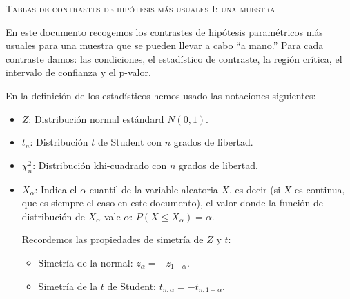 \documentclass{article}
\renewcommand{\leq}{\leqslant}
\begin{document}

\renewcommand{\thecas}{\Roman{cas}}
\newcommand{\posacas}{\addtocounter{cas}{1}{\bf \thecas}}

\begin{center}
\textsc{Tablas de contrastes de hipótesis más usuales I: una muestra}
\end{center}
\vspace*{2cm}

\noindent En este documento recogemos los contrastes de hipótesis paramétricos más usuales para una muestra  que se pueden llevar a cabo ``a mano.'' Para cada contraste damos: las condiciones, el estadístico
de contraste, la región crítica, 
el intervalo de confianza y el p-valor.

En la definición de los estadísticos hemos usado las notaciones siguientes:
\begin{itemize}
\item  $Z$: {Distribución normal estándard $N(0,1)$.} 
\item $t_n$: {Distribución
$t$ de Student con $n$ grados de libertad.} 
\item $\chi_n^2$: {Distribución
khi-cuadrado con $n$ grados de libertad.} 
\item $X_\alpha$: Indica el $\alpha$-cuantil de la variable aleatoria $X$, es decir (si $X$ es continua, que es siempre el caso en este documento), el valor donde la función
de distribución de $X_\alpha$ vale $\alpha$: $P(X\leq X_\alpha
)=\alpha$. 

Recordemos las propiedades de simetría de $Z$ y   $t$:
\begin{itemize}
\item Simetría de la normal: $z_\alpha = -z_{1-\alpha}.$
\item Simetría de la $t$ de Student: $t_{n,\alpha} = -t_{n,1-\alpha}.$
\end{itemize}
\end{itemize}
\end{document}
